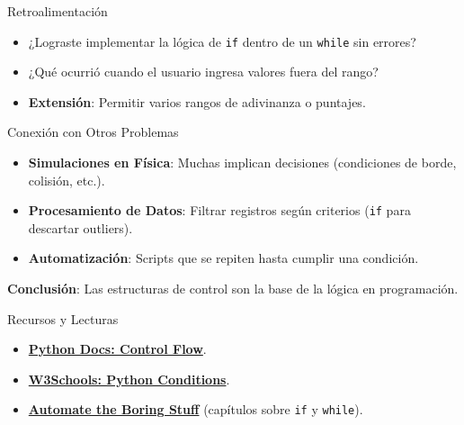 \documentclass[10pt]{beamer}
\begin{document}
\begin{frame}{Retroalimentación}
  \begin{itemize}
    \item ¿Lograste implementar la lógica de \texttt{if} dentro de un \texttt{while} sin errores?
    \item ¿Qué ocurrió cuando el usuario ingresa valores fuera del rango?
    \item \textbf{Extensión}: Permitir varios rangos de adivinanza o puntajes.
  \end{itemize}
\end{frame}

\begin{frame}{Conexión con Otros Problemas}
  \begin{itemize}
    \item \textbf{Simulaciones en Física}: Muchas implican decisiones (condiciones de borde, colisión, etc.).
    \item \textbf{Procesamiento de Datos}: Filtrar registros según criterios (\texttt{if} para descartar outliers).
    \item \textbf{Automatización}: Scripts que se repiten hasta cumplir una condición.
  \end{itemize}
  \textbf{Conclusión}: Las estructuras de control son la base de la lógica en programación.
\end{frame}

\begin{frame}{Recursos y Lecturas}
  \begin{itemize}
    \item \href{https://docs.python.org/3/tutorial/controlflow.html}{\textbf{Python Docs: Control Flow}}.
    \item \href{https://www.w3schools.com/python/python\_conditions.asp}{\textbf{W3Schools: Python Conditions}}.
    \item \href{https://automatetheboringstuff.com/}{\textbf{Automate the Boring Stuff}} (capítulos sobre \texttt{if} y \texttt{while}).
  \end{itemize}
\end{frame}
\end{document}
